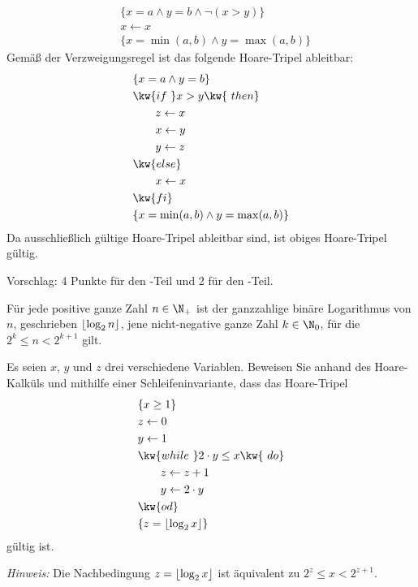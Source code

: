 \documentclass[12pt]{article}
\DeclarePairedDelimiter\floor{\lfloor}{\rfloor}
\begin{document}
\begin{loesung}
  \begin{align*}
    & \{ x = a \land y = b \land \neg (x > y) \} \\
    & x \gets x \\
    & \{ x = \min(a, b) \land y = \max(a, b) \}
  \end{align*}
  Gemäß der Verzweigungsregel ist das folgende Hoare-Tripel ableitbar:
  \begin{align*}
    & \{ x = a \land y = b \} \\
    & \kw{if\ } x > y \kw{\ then} \\
    & \qquad z \gets x \\
    & \qquad x \gets y \\
    & \qquad y \gets z \\
    & \kw{else} \\
    & \qquad x \gets x \\
    & \kw{fi} \\
    & \{ x = \min(a, b) \land y = \max(a, b) \}
  \end{align*}
  Da ausschließlich gültige Hoare-Tripel ableitbar sind, ist obiges Hoare-Tripel gültig.

  \begin{korrektur}
    Vorschlag: 4 Punkte für den -Teil und 2 für den
    -Teil.
  \end{korrektur}
\end{loesung}


\begin{aufgabe}[8]
  Für jede positive ganze Zahl $n \in \N_+$ ist der ganzzahlige binäre Logarithmus von $n$, geschrieben $\floor{\log_2 n}$, jene nicht-negative ganze Zahl $k \in \N_0$, für die $2^k \leq n < 2^{k + 1}$ gilt.

  Es seien $x$, $y$ und $z$ drei verschiedene Variablen. Beweisen Sie anhand des Hoare-Kalküls und mithilfe einer Schleifeninvariante, dass das Hoare-Tripel
  \begin{align*}
    & \{ x \geq 1 \} \\
    & z \gets 0 \\
    & y \gets 1 \\
    & \kw{while\ } 2 \cdot y \leq x \kw{\ do} \\
    & \qquad z \gets z + 1 \\
    & \qquad y \gets 2 \cdot y \\
    & \kw{od} \\
    & \{ z = \floor{\log_2 x} \}
  \end{align*}
  gültig ist.

  \emph{Hinweis:} Die Nachbedingung $z = \floor{\log_2 x}$ ist äquivalent zu $2^z \leq x < 2^{z + 1}$.
\end{aufgabe}
\end{document}
